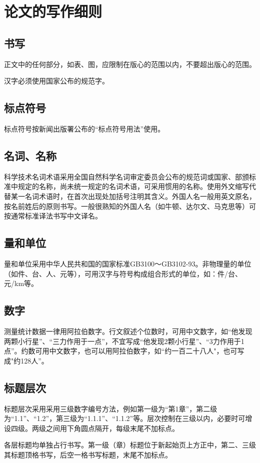 \chapter{论文的写作细则}
\label{chap:details}
\section{书写}
\par 正文中的任何部分，如表、图，应限制在版心的范围以内，不要超出版心的范围。
\par 汉字必须使用国家公布的规范字。

\section{标点符号}
\par 标点符号按新闻出版署公布的“标点符号用法”使用。

\section{名词、名称}
\par 科学技术名词术语采用全国自然科学名词审定委员会公布的规范词或国家、部颁标准中规定的名称，尚未统一规定的名词术语，可采用惯用的名称。使用外文缩写代替某一名词术语时，在首次出现处加括号注明其含义。外国人名一般用英文原名，按名前姓后的原则书写。一般很熟知的外国人名（如牛顿、达尔文、马克思等）可按通常标准译法书写中文译名。

\section{量和单位}
\par 量和单位采用中华人民共和国的国家标准GB3100～GB3102-93。非物理量的单位（如件、台、人、元等），可用汉字与符号构成组合形式的单位，如：件/台、元/km等。

\section{数字}
\par 测量统计数据一律用阿拉伯数字。行文叙述个位数时，可用中文数字，如“他发现两颗小行星”、“三力作用于一点”，不宜写成“他发现2颗小行星”、“3力作用于1点”。约数可用中文数字，也可以用阿拉伯数字，如“约一百二十八人"，也可写成"约128人”。

\section{标题层次}
\par 标题层次采用采用三级数字编号方法，例如第一级为“第1章”，第二级为“1.1”、“1.2”，第三级为“1.1.1”、“1.1.2”等。层次控制在三级以内，必要时可增设四级。两级之间用下角圆点隔开，每级末尾不加标点。
\par 各层标题均单独占行书写。第一级（章）标题位于新起始页上方正中，第二、三级其标题顶格书写，后空一格书写标题，末尾不加标点。

